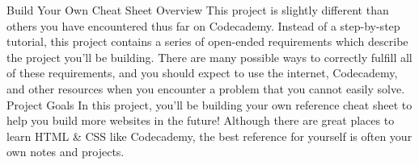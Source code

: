 Build Your Own Cheat Sheet
Overview
    This project is slightly different than others you have encountered thus far on Codecademy. Instead of a step-by-step tutorial, this project contains a series of open-ended requirements which describe the project you’ll be building. There are many possible ways to correctly fulfill all of these requirements, and you should expect to use the internet, Codecademy, and other resources when you encounter a problem that you cannot easily solve.
Project Goals
    In this project, you’ll be building your own reference cheat sheet to help you build more websites in the future! Although there are great places to learn HTML & CSS like Codecademy, the best reference for yourself is often your own notes and projects.

